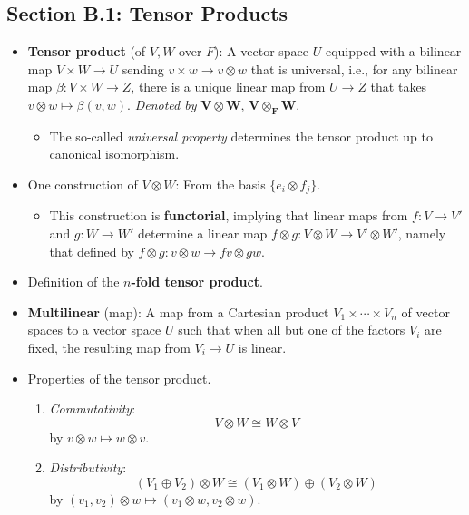 \documentclass[../notes.tex]{subfiles}
\begin{document}
\subsection*{Section B.1: Tensor Products}
\begin{itemize}
    \item {}\textbf{Tensor product} (of $V,W$ over $F$): A vector space $U$ equipped with a bilinear map $V\times W\to U$ sending $v\times w\to v\otimes w$ that is universal, i.e., for any bilinear map $\beta:V\times W\to Z$, there is a unique linear map from $U\to Z$ that takes $v\otimes w\mapsto\beta(v,w)$. \emph{Denoted by} $\bm{V\otimes W}$, $\bm{V\otimes_FW}$.
    \begin{itemize}
        \item The so-called \emph{universal property} determines the tensor product up to canonical isomorphism.
    \end{itemize}
    \item One construction of $V\otimes W$: From the basis $\{e_i\otimes f_j\}$.
    \begin{itemize}
        \item This construction is \textbf{functorial}, implying that linear maps from $f:V\to V'$ and $g:W\to W'$ determine a linear map $f\otimes g:V\otimes W\to V'\otimes W'$, namely that defined by $f\otimes g:v\otimes w\to fv\otimes gw$.
    \end{itemize}
    \item Definition of the \textbf{$n$-fold tensor product}.
    \item \textbf{Multilinear} (map): A map from a Cartesian product $V_1\times\cdots\times V_n$ of vector spaces to a vector space $U$ such that when all but one of the factors $V_i$ are fixed, the resulting map from $V_i\to U$ is linear.
    \item Properties of the tensor product.
    \begin{enumerate}
        \item \emph{Commutativity}:
        \begin{equation*}
            V\otimes W\cong W\otimes V
        \end{equation*}
        by $v\otimes w\mapsto w\otimes v$.
        \item \emph{Distributivity}:
        \begin{equation*}
            (V_1\oplus V_2)\otimes W \cong (V_1\otimes W)\oplus(V_2\otimes W)
        \end{equation*}
        by $(v_1,v_2)\otimes w\mapsto(v_1\otimes w,v_2\otimes w)$.

\end{enumerate}
\end{itemize}
\end{document}
